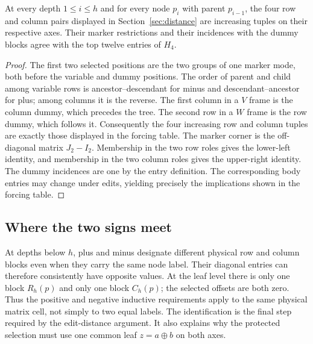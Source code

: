 \begin{lemma}
\label{lem:framesorder}
At every depth $1\le i\le h$ and for every node $p_i$ with parent
$p_{i-1}$, the four row and column pairs displayed in
Section~\ref{sec:distance} are increasing tuples on their respective
axes. Their marker restrictions and their incidences with the dummy
blocks agree with the top twelve entries of $H_4$.
\end{lemma}
\begin{proof}
The first two selected positions are the two groups of one marker
mode, both before the variable and dummy positions. The order of
parent and child among variable rows is ancestor--descendant for
minus and descendant--ancestor for plus; among columns it is the
reverse. The first column in a $V$ frame is the column dummy,
which precedes the tree. The second row in a $W$ frame is the row
dummy, which follows it. Consequently the four increasing row and
column tuples are exactly those displayed in the forcing table.
The marker corner is the off-diagonal matrix $J_2-I_2$.
Membership in the two row roles gives the lower-left identity,
and membership in the two column roles gives the upper-right
identity. The dummy incidences are one by the entry definition.
The corresponding body entries may change under edits, yielding
precisely the implications shown in the forcing table.
\end{proof}

\subsection{Where the two signs meet}
At depths below $h$, plus and minus designate different physical
row and column blocks even when they carry the same node label.
Their diagonal entries can therefore consistently have opposite
values. At the leaf level there is only one block $R_h(p)$ and only
one block $C_h(p)$; the selected offsets are both zero. Thus the
positive and negative inductive requirements apply to the same
physical matrix cell, not simply to two equal labels. The
identification is the final step required by the edit-distance
argument. It also explains why the protected selection must use
one common leaf $z=a\oplus b$ on both axes.
